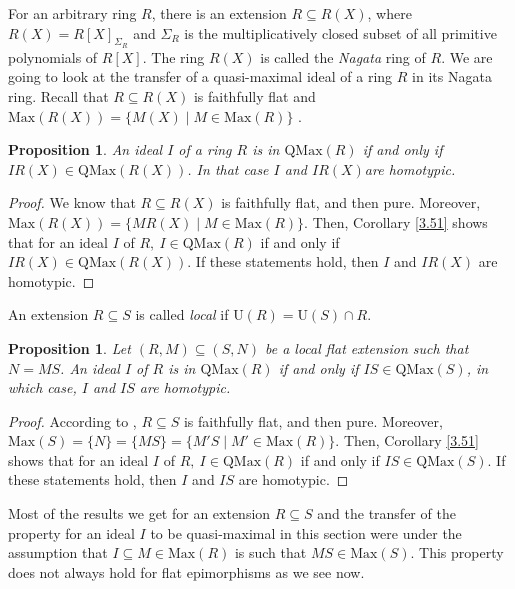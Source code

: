 \documentclass[12pt,leqno]{amsart}
\newtheorem{proposition}[theorem]{Proposition}
\theoremstyle{definition}
\begin{document}
For an arbitrary ring $R$, there is an extension $R\subseteq R(X)$, where $R(X)=R[X]_{\Sigma_R}$ and $\Sigma_R$ is the multiplicatively closed subset of all primitive polynomials of $R[X]$. The ring $R(X)$ is called the {\it Nagata} ring of $R$. We are going to look at the transfer of a quasi-maximal ideal of a ring $R$ in its Nagata ring. Recall that $R\subseteq R(X)$ is faithfully flat and $\mathrm{Max}(R(X))=\{M(X)\mid M\in\mathrm{Max}(R)\}$ \cite[Section 3]{DPP3}.

\begin{proposition}\label{2.111} An ideal $I$ of a ring $R$ is in $\mathrm {QMax}(R)$ if and only if $IR(X)\in\mathrm{QMax}(R(X))$. In that case $I$ and $IR(X)$are homotypic. 
\end{proposition}
\begin{proof} We know that $R\subseteq R(X)$ is faithfully flat, and then pure. Moreover, $\mathrm{Max}(R(X))=\{MR(X)\mid M\in\mathrm{Max}(R)\}$. Then, Corollary \ref{3.51} shows that for an ideal $I$ of $R,\ I\in\mathrm {QMax}(R)$ if and only if $IR(X)\in\mathrm{QMax}(R(X))$. If these statements hold, then $I$ and $IR(X)$ are homotypic.
\end{proof}

An extension $R\subseteq S$ is called {\it local} if $\mathrm U(R)= \mathrm U(S)\cap R$. 

\begin{proposition}\label{3.15} Let $(R,M)\subseteq(S,N)$ be a local flat extension such that $N=MS$. An ideal $I$ of $R$ is in $\mathrm{QMax}(R)$ if and only if $IS\in\mathrm{QMax}(S)$, in which case, $I$ and $IS$ are homotypic. 
\end{proposition}
\begin{proof} According to \cite[Proposition 6.6.1]{EGA}, $R\subseteq S$ is faithfully flat, and then pure. Moreover, $\mathrm{Max}(S)=\{N\}=\{MS\}=\{M'S\mid M'\in\mathrm{Max}(R)\}$. Then, Corollary \ref{3.51} shows that for an ideal $I$ of $R,\ I\in\mathrm{QMax}(R)$ if and only if $IS\in\mathrm {QMax}(S)$. If these statements hold, then $I$ and $I S$ are homotypic.
\end{proof}

Most of the results we get for an extension $R\subseteq S$ and the transfer of the property for an ideal $I$ to be quasi-maximal in this section were under the assumption that $I\subseteq M\in\mathrm{Max}(R)$ is such that $MS\in\mathrm{Max}(S)$. This property does not always hold for flat epimorphisms as we see now. 
\end{document}

